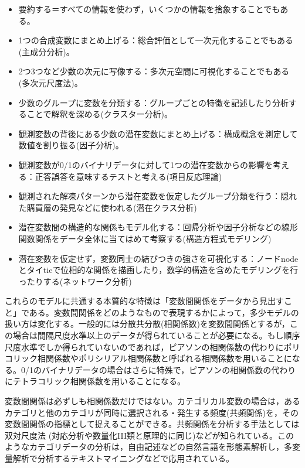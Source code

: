 \documentclass[
  a4paper,
]{ltjsbook}
\providecommand{\tightlist}{%
  \setlength{\itemsep}{0pt}\setlength{\parskip}{0pt}}
\begin{document}
\begin{itemize}
\tightlist
\item
  要約する＝すべての情報を使わず，いくつかの情報を捨象することでもある。
\item
  1つの合成変数にまとめ上げる：総合評価として一次元化することでもある(主成分分析)。
\item
  2つ3つなど少数の次元に写像する：多次元空間に可視化することでもある(多次元尺度法)。
\item
  少数のグループに変数を分類する：グループごとの特徴を記述したり分析することで解釈を深める(クラスター分析)。
\item
  観測変数の背後にある少数の潜在変数にまとめ上げる：構成概念を測定して数値を割り振る(因子分析)。
\item
  観測変数が0/1のバイナリデータに対して1つの潜在変数からの影響を考える：正答誤答を意味するテストと考える(項目反応理論)
\item
  観測された解凍パターンから潜在変数を仮定したグループ分類を行う：隠れた購買層の発見などに使われる(潜在クラス分析)
\item
  潜在変数間の構造的な関係もモデル化する：回帰分析や因子分析などの線形関数関係をデータ全体に当てはめて考察する(構造方程式モデリング)
\item
  潜在変数を仮定せず，変数同士の結びつきの強さを可視化する：ノードnodeとタイtieで位相的な関係を描画したり，数学的構造を含めたモデリングを行ったりする(ネットワーク分析)
\end{itemize}

これらのモデルに共通する本質的な特徴は「変数間関係をデータから見出すこと」である。変数間関係をどのようなもので表現するかによって，多少モデルの扱い方は変化する。一般的には分散共分散(相関係数)を変数間関係とするが，この場合は間隔尺度水準以上のデータが得られていることが必要になる。もし順序尺度水準でしか得られていないのであれば，ピアソンの相関係数の代わりにポリコリック相関係数やポリシリアル相関係数と呼ばれる相関係数を用いることになる。0/1のバイナリデータの場合はさらに特殊で，ピアソンの相関係数の代わりにテトラコリック相関係数を用いることになる。

変数間関係は必ずしも相関係数だけではない。カテゴリカル変数の場合は，あるカテゴリと他のカテゴリが同時に選択される・発生する頻度(共頻関係)を，その変数間関係の指標として捉えることができる。共頻関係を分析する手法としては双対尺度法\autocite{Nishisato2010}
(対応分析や数量化III類と原理的に同じ)などが知られている。このようなカテゴリデータの分析は，自由記述などの自然言語を形態素解析し，多変量解析で分析するテキストマイニングなどで応用されている。
\end{document}
